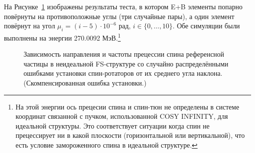 На Рисунке~\ref{fig:Linearity_test_compensated} изображены результаты теста, в котором E+B элементы попарно повёрнуты на противоположные углы (три случайные пары), а один элемент повёрнут на угол
$\mu_i = (i-5)\cdot 10^{-6}$ рад, $i\in\lbrace0,\dots,10\rbrace$. Обе симуляции были выполнены на энергии
270.0092 МэВ.\footnote{На этой энергии ось прецесии спина и спин-тюн
	не определены в системе координат связанной с пучком, использованной
	COSY INFINITY, для идеальной структуры. Это соответствует ситуации
	когда спин не прецессирует ни в какой плоскости (горизонтальной или
	вертикальной), что есть условие замороженного спина в идеальной структуре.}

\begin{figure}[!h]
	\centering\hfill
	\hfill
	\hfill
	\caption{Зависимость направления и частоты прецессии спина референсной частицы в неидеальной FS-структуре со случайно распределёнными ошибками установки спин-ротаторов от их среднего угла наклона. (Скомпенсированная ошибка установки.)\label{fig:Linearity_test_compensated}}
\end{figure}